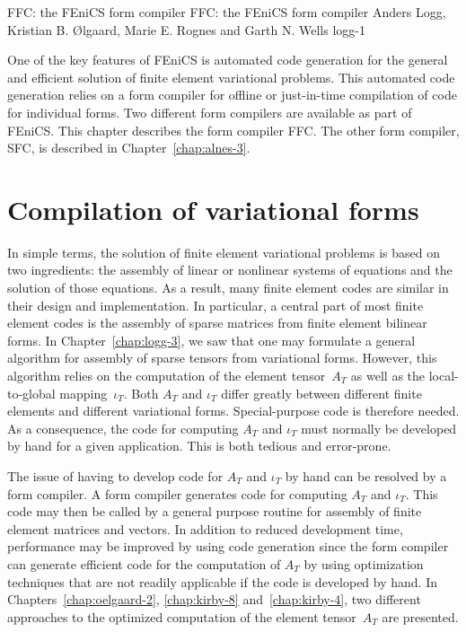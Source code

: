               {FFC: the FEniCS form compiler}
              {FFC: the FEniCS form compiler}
              {Anders Logg, Kristian B. \O{}lgaard, Marie E. Rognes and Garth N. Wells}
              {logg-1}


One of the key features of FEniCS is automated code generation for
the general and efficient solution of finite element variational
problems. This automated code generation relies on a form compiler for
offline or just-in-time compilation of code for individual forms. Two
different form compilers are available as part of FEniCS. This chapter
describes the form compiler FFC. The other form compiler, SFC, is
described in Chapter~\ref{chap:alnes-3}.


\section{Compilation of variational forms}

In simple terms, the solution of finite element variational problems
is based on two ingredients: the assembly of linear or nonlinear
systems of equations and the solution of those equations. As a result,
many finite element codes are similar in their design and
implementation. In particular, a central part of most finite element
codes is the assembly of sparse matrices from finite element bilinear
forms. In Chapter~\ref{chap:logg-3}, we saw that one may formulate a
general algorithm for assembly of sparse tensors from variational
forms. However, this algorithm relies on the computation of the
element tensor~$A_T$ as well as the local-to-global mapping~$\iota_T$.
Both $A_T$ and $\iota_T$ differ greatly between different finite
elements and different variational forms. Special-purpose code is
therefore needed. As a consequence, the code for computing $A_T$ and
$\iota_T$ must normally be developed by hand for a given
application. This is both tedious and error-prone.


The issue of having to develop code for $A_T$ and $\iota_T$ by hand
can be resolved by a form compiler. A form compiler generates code for
computing $A_T$ and $\iota_T$. This code may then be called by a
general purpose routine for assembly of finite element matrices and
vectors. In addition to reduced development time, performance may be
improved by using code generation since the form compiler can generate
efficient code for the computation of $A_T$ by using optimization
techniques that are not readily applicable if the code is developed by
hand. In Chapters~\ref{chap:oelgaard-2}, \ref{chap:kirby-8}
and~\ref{chap:kirby-4}, two different approaches to the optimized
computation of the element tensor~$A_T$ are presented.

